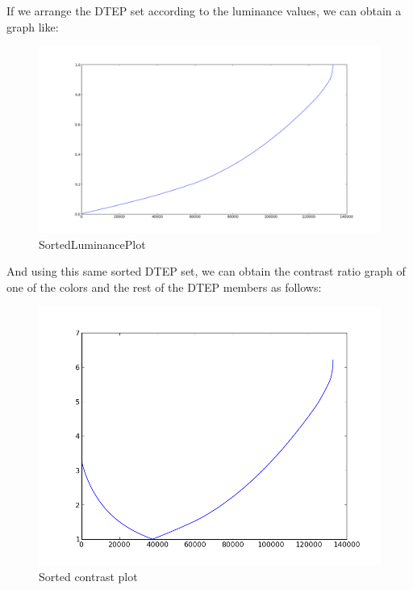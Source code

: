 If we arrange the DTEP set according to the luminance values, we can obtain a graph like:
\begin{figure}[!htb]
\centering
\includegraphics[width=\linewidth]{SortedLuminanceDTEP.png}
\caption{SortedLuminancePlot}
\label{fig:LuminanceSortedPlot}
\end{figure}

And using this same sorted DTEP set, we can obtain the contrast ratio graph of one of the colors and the rest of the DTEP members as follows:
\begin{figure}[!htb]
\centering
\includegraphics[width=\linewidth]{SortedContrast.png}
\caption{Sorted contrast plot}
\label{fig:SortedContrastPlot}
\end{figure}

